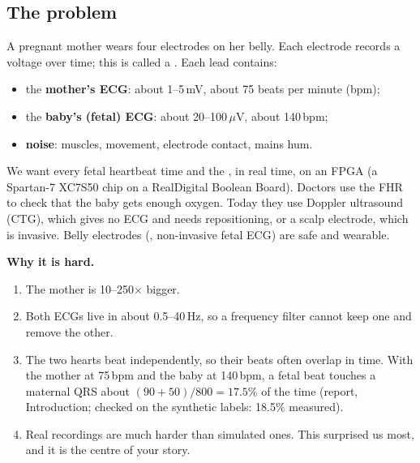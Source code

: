 \documentclass[11pt]{article}
\begin{document}
\subsection{The problem}
A pregnant mother wears four electrodes on her belly. Each electrode records a voltage over time; this is called a . Each lead contains:
\begin{itemize}
  \item the \textbf{mother's ECG}: about 1--5\,mV, about 75 beats per minute (bpm);
  \item the \textbf{baby's (fetal) ECG}: about 20--100\,$\mu$V, about 140\,bpm;
  \item \textbf{noise}: muscles, movement, electrode contact, mains hum.
\end{itemize}
We want every fetal heartbeat time and the , in real time, on an FPGA (a Spartan-7 XC7S50 chip on a RealDigital Boolean Board). Doctors use the FHR to check that the baby gets enough oxygen. Today they use Doppler ultrasound (CTG), which gives no ECG and needs repositioning, or a scalp electrode, which is invasive. Belly electrodes (, non-invasive fetal ECG) are safe and wearable.

\textbf{Why it is hard.}
\begin{enumerate}
  \item The mother is 10--250$\times$ bigger.
  \item Both ECGs live in about 0.5--40\,Hz, so a frequency filter cannot keep one and remove the other.
  \item The two hearts beat independently, so their beats often overlap in time. With the mother at 75\,bpm and the baby at 140\,bpm, a fetal beat touches a maternal QRS about $(90+50)/800 = 17.5\%$ of the time (report, Introduction; checked on the synthetic labels: 18.5\% measured).
  \item Real recordings are much harder than simulated ones. This surprised us most, and it is the centre of your story.
\end{enumerate}
\end{document}
